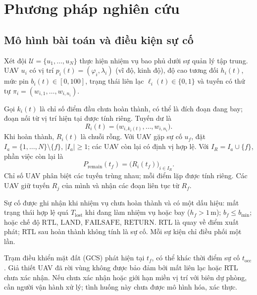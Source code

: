 \documentclass[11pt,a4paper]{article}
\newcommand{\Uset}{\mathcal{U}}
\newcommand{\Premain}{P_{\mathrm{remain}}}
\newcommand{\Tlost}{T_{\mathrm{lost}}}
\newcommand{\bmin}{b_{\mathrm{min}}}
\begin{document}
\section{Phương pháp nghiên cứu}

\subsection{Mô hình bài toán và điều kiện sự cố}

Xét đội $\Uset=\{u_1,\ldots,u_N\}$ thực hiện nhiệm vụ bao phủ dưới sự quản lý tập trung. UAV $u_i$ có vị trí $p_i(t)=(\varphi_i,\lambda_i)$ (vĩ độ, kinh độ), độ cao tương đối $h_i(t)$, mức pin $b_i(t)\in[0,100]$, trạng thái liên lạc $\ell_i(t)\in\{0,1\}$ và tuyến có thứ tự $\pi_i=(w_{i,1},\ldots,w_{i,n_i})$.

Gọi $k_i(t)$ là chỉ số điểm đầu chưa hoàn thành, có thể là đích đoạn đang bay; đoạn nối từ vị trí hiện tại được tính riêng. Tuyến dư là
\begin{equation}
  R_{i}(t)=\bigl(w_{i,k_{i}(t)},\ldots,w_{i,n_{i}}\bigr).
\end{equation}
Khi hoàn thành, $R_i(t)$ là chuỗi rỗng. Với UAV gặp sự cố $u_f$, đặt $I_a=\{1,\ldots,N\}\setminus\{f\}$, $|I_a|\ge1$; các UAV còn lại có định vị hợp lệ. Với $I_R=I_a\cup\{f\}$, phần việc còn lại là
\begin{equation}
 \Premain(t_f)=\bigl(R_i(t_f)\bigr)_{i\in I_R}.
\end{equation}
Chỉ số UAV phân biệt các tuyến trùng nhau; mỗi điểm lặp được tính riêng. Các UAV giữ tuyến $R_j$ của mình và nhận các đoạn liên tục từ $R_f$.

Sự cố được ghi nhận khi nhiệm vụ chưa hoàn thành và có một dấu hiệu: mất trạng thái hợp lệ quá $\Tlost$ khi đang làm nhiệm vụ hoặc bay ($h_f>1\,\mathrm{m}$); $b_f\le\bmin$; hoặc chế độ $\mathrm{RTL}$, $\mathrm{LAND}$, $\mathrm{FAILSAFE}$, $\mathrm{RETURN}$. RTL là quay về điểm xuất phát; RTL sau hoàn thành không tính là sự cố. Mỗi sự kiện chỉ điều phối một lần.

Trạm điều khiển mặt đất (GCS) phát hiện tại $t_f$, có thể khác thời điểm sự cố $t_{\mathrm{occ}}$. Giả thiết UAV đã rời vùng không được bảo đảm bởi mất liên lạc hoặc RTL chưa xác nhận. Nếu chưa xác nhận hoặc giới hạn miền vị trí với biên dự phòng, cần người vận hành xử lý; tình huống này chưa được mô hình hóa, xác thực.
\end{document}
